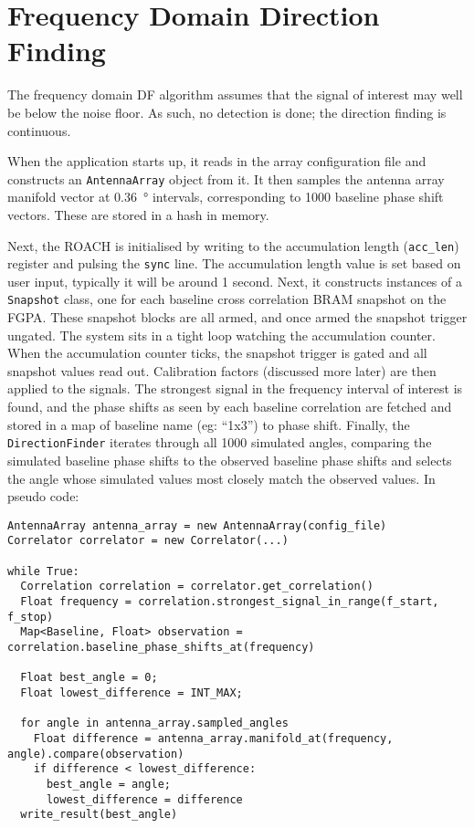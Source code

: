 \section{Frequency Domain Direction Finding}
The frequency domain DF algorithm assumes that the signal of interest may well be below the noise floor. As such, no detection is done; the direction finding is continuous. 

When the application starts up, it reads in the array configuration file and constructs an \lstinline{AntennaArray} object from it. It then samples the antenna array manifold vector at \SI{0.36}{\degree} intervals, corresponding to 1000 baseline phase shift vectors. These are stored in a hash in memory. 

Next, the ROACH is initialised by writing to the accumulation length (\lstinline{acc_len}) register and pulsing the \lstinline{sync} line. The accumulation length value is set based on user input, typically it will be around 1 second. Next, it constructs instances of a \lstinline{Snapshot} class, one for each baseline cross correlation BRAM snapshot on the FGPA. These snapshot blocks are all armed, and once armed the snapshot trigger ungated. The system sits in a tight loop watching the accumulation counter. When the accumulation counter ticks, the snapshot trigger is gated and all snapshot values read out. Calibration factors (discussed more later) are then applied to the signals. The strongest signal in the frequency interval of interest is found, and the phase shifts as seen by each baseline correlation are fetched and stored in a map of baseline name (eg: ``1x3'')  to phase shift. Finally, the \lstinline{DirectionFinder} iterates through all 1000 simulated angles, comparing the simulated baseline phase shifts to the observed baseline phase shifts and selects the angle whose simulated values most closely match the observed values. In pseudo code:

\begin{lstlisting}
AntennaArray antenna_array = new AntennaArray(config_file)
Correlator correlator = new Correlator(...)

while True:
  Correlation correlation = correlator.get_correlation()
  Float frequency = correlation.strongest_signal_in_range(f_start, f_stop)
  Map<Baseline, Float> observation = correlation.baseline_phase_shifts_at(frequency)

  Float best_angle = 0;
  Float lowest_difference = INT_MAX;

  for angle in antenna_array.sampled_angles
    Float difference = antenna_array.manifold_at(frequency, angle).compare(observation)
    if difference < lowest_difference:
      best_angle = angle;
      lowest_difference = difference
  write_result(best_angle)
\end{lstlisting}

